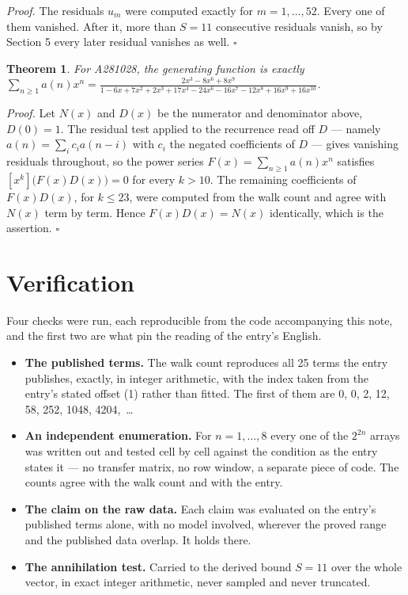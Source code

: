 \documentclass[11pt]{article}
\newtheorem{theorem}{Theorem}
\theoremstyle{definition}
\begin{document}
{\itshape Proof.} The residuals $u_m$ were computed exactly for $m = 1,\dots,52$. Every one of them vanished. After it, more than $S = 11$ consecutive residuals vanish, so by Section 5 every later residual vanishes as well. $\square$

\begin{theorem} For A281028, the generating function is exactly $\sum_{n\ge 1} a(n)x^n = \frac{2x^{3} - 8x^{6} + 8x^{9}}{1 - 6x + 7x^{2} + 2x^{3} + 17x^{4} - 24x^{6} - 16x^{7} - 12x^{8} + 16x^{9} + 16x^{10}}$.\end{theorem}

{\itshape Proof.} Let $N(x)$ and $D(x)$ be the numerator and denominator above, $D(0)=1$. The residual test applied to the recurrence read off $D$ --- namely $a(n) = \sum_i c_i a(n-i)$ with $c_i$ the negated coefficients of $D$ --- gives vanishing residuals throughout, so the power series $F(x)=\sum_{n\ge 1}a(n)x^n$ satisfies $[x^k]\bigl(F(x)D(x)\bigr) = 0$ for every $k > 10$. The remaining coefficients of $F(x)D(x)$, for $k \le 23$, were computed from the walk count and agree with $N(x)$ term by term. Hence $F(x)D(x) = N(x)$ identically, which is the assertion. $\square$

\section{Verification}

Four checks were run, each reproducible from the code accompanying this note, and the first two are what pin the reading of the entry's English.

\begin{itemize}

\item {\bfseries The published terms.} The walk count reproduces all 25 terms the entry publishes, exactly, in integer arithmetic, with the index taken from the entry's stated offset (1) rather than fitted. The first of them are 0, 0, 2, 12, 58, 252, 1048, 4204,~\dots

\item {\bfseries An independent enumeration.} For $n = 1,\dots,8$ every one of the $2^{2n}$ arrays was written out and tested cell by cell against the condition as the entry states it --- no transfer matrix, no row window, a separate piece of code. The counts agree with the walk count and with the entry.

\item {\bfseries The claim on the raw data.} Each claim was evaluated on the entry's published terms alone, with no model involved, wherever the proved range and the published data overlap. It holds there.

\item {\bfseries The annihilation test.} Carried to the derived bound $S = 11$ over the whole vector, in exact integer arithmetic, never sampled and never truncated.

\end{itemize}
\end{document}
